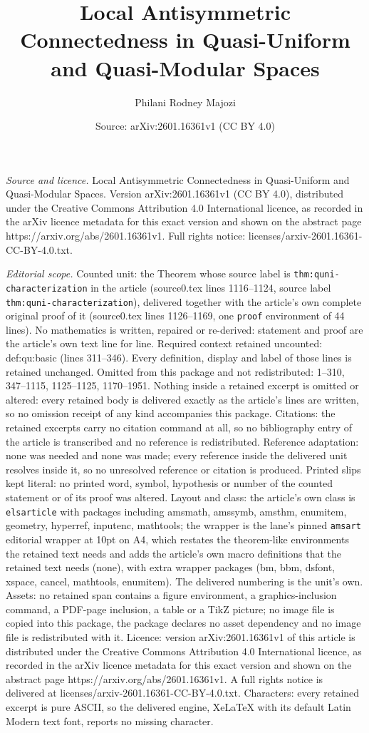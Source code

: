 \documentclass[10pt,a4paper]{amsart}
\title[Local Antisymmetric Connectedness in Quasi-Uniform and Quasi]{Local Antisymmetric Connectedness in Quasi-Uniform and Quasi-Modular Spaces}
\author{Philani Rodney Majozi}
\date{Source: arXiv:2601.16361v1 (CC BY 4.0)}
\begin{document}
\maketitle

\noindent\emph{Source and licence.} Local Antisymmetric Connectedness in Quasi-Uniform and Quasi-Modular Spaces. Version arXiv:2601.16361v1 (CC BY 4.0), distributed under the Creative Commons Attribution 4.0 International licence, as recorded in the arXiv licence metadata for this exact version and shown on the abstract page https://arxiv.org/abs/2601.16361v1. Full rights notice: licenses/arxiv-2601.16361-CC-BY-4.0.txt.\par\smallskip

\noindent\textit{Editorial scope.} Counted unit: the Theorem whose source label is \texttt{thm:quni-characterization} in the article (source0.tex lines 1116--1124, source label \texttt{thm:quni-characterization}), delivered together with the article's own complete original proof of it (source0.tex lines 1126--1169, one \texttt{proof} environment of 44 lines). No mathematics is written, repaired or re-derived: statement and proof are the article's own text line for line. Required context retained uncounted: def:qu:basic (lines 311--346). Every definition, display and label of those lines is retained unchanged. Omitted from this package and not redistributed: 1--310, 347--1115, 1125--1125, 1170--1951. Nothing inside a retained excerpt is omitted or altered: every retained body is delivered exactly as the article's lines are written, so no omission receipt of any kind accompanies this package. Citations: the retained excerpts carry no citation command at all, so no bibliography entry of the article is transcribed and no reference is redistributed. Reference adaptation: none was needed and none was made; every reference inside the delivered unit resolves inside it, so no unresolved reference or citation is produced. Printed slips kept literal: no printed word, symbol, hypothesis or number of the counted statement or of its proof was altered. Layout and class: the article's own class is \texttt{elsarticle} with packages including amsmath, amssymb, amsthm, enumitem, geometry, hyperref, inputenc, mathtools; the wrapper is the lane's pinned \texttt{amsart} editorial wrapper at 10pt on A4, which restates the theorem-like environments the retained text needs and adds the article's own macro definitions that the retained text needs (none), with extra wrapper packages (bm, bbm, dsfont, xspace, cancel, mathtools, enumitem). The delivered numbering is the unit's own. Assets: no retained span contains a figure environment, a graphics-inclusion command, a PDF-page inclusion, a table or a TikZ picture; no image file is copied into this package, the package declares no asset dependency and no image file is redistributed with it. Licence: version arXiv:2601.16361v1 of this article is distributed under the Creative Commons Attribution 4.0 International licence, as recorded in the arXiv licence metadata for this exact version and shown on the abstract page https://arxiv.org/abs/2601.16361v1. A full rights notice is delivered at licenses/arxiv-2601.16361-CC-BY-4.0.txt. Characters: every retained excerpt is pure ASCII, so the delivered engine, XeLaTeX with its default Latin Modern text font, reports no missing character.
\end{document}
